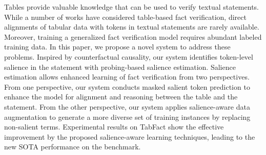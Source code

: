 Tables provide valuable knowledge that can be used to verify textual statements. While a number of works have considered table-based fact verification, direct alignments of tabular data with tokens in textual statements are rarely available. Moreover, training a generalized fact verification model requires abundant labeled training data. In this paper, we propose a novel system to address these problems. Inspired by counterfactual causality, our system identifies token-level salience in the statement with probing-based salience estimation. Salience estimation allows enhanced learning of fact verification from two perspectives. From one perspective, our system conducts masked salient token prediction to enhance the model for alignment and reasoning between the table and the statement. From the other perspective, our system applies salience-aware data augmentation to generate a more diverse set of training instances by replacing non-salient terms. Experimental results on TabFact show the effective improvement by the proposed salience-aware learning techniques, leading to the new SOTA performance on the benchmark.
